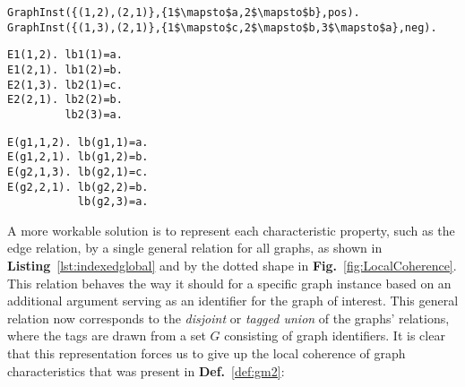 \documentclass{article}
\theoremstyle{definition}
\newcommand{\graphset}[1]{\ensuremath{\mathbb{#1}}}
\begin{document}
\begin{lstlisting}[mathescape,caption=Higher order predicate modeling the set $\graphset{G}$ of Def~\ref{def:gm2}.,label=lst:HOPred]
GraphInst({(1,2),(2,1)},{1$\mapsto$a,2$\mapsto$b},pos).
GraphInst({(1,3),(2,1)},{1$\mapsto$c,2$\mapsto$b,3$\mapsto$a},neg).
\end{lstlisting}
\begin{minipage}[t]{0.5\textwidth}
\begin{lstlisting}[mathescape,caption=Multiple global relations,label=lst:multiglobal]
E1(1,2). lb1(1)=a.
E1(2,1). lb1(2)=b.
E2(1,3). lb2(1)=c.
E2(2,1). lb2(2)=b.
         lb2(3)=a.
\end{lstlisting}
\end{minipage}
\begin{minipage}[t]{0.5\textwidth}
\begin{lstlisting}[mathescape,caption=Indexed global relation,label=lst:indexedglobal]
E(g1,1,2). lb(g1,1)=a.
E(g1,2,1). lb(g1,2)=b.
E(g2,1,3). lb(g2,1)=c.
E(g2,2,1). lb(g2,2)=b.
           lb(g2,3)=a.
\end{lstlisting}
\end{minipage}




A more workable solution is to represent each characteristic property, such as the edge relation, by a single general relation for all graphs, as shown in \textbf{Listing}~\ref{lst:indexedglobal} and by the dotted shape in \textbf{Fig.}~\ref{fig:LocalCoherence}.
This relation behaves the way it should for a specific graph instance based on an additional argument serving as an identifier for the graph of interest.
This general relation now corresponds to the \emph{disjoint} or \emph{tagged union} of the graphs' relations, where the tags are drawn from a set $G$ consisting of graph identifiers.
It is clear that this representation forces us to give up the local coherence of graph characteristics that was present in \textbf{Def.}~\ref{def:gm2}: 
\end{document}
